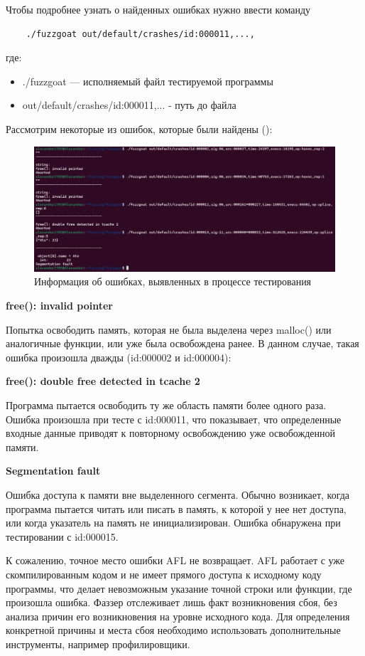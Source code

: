 Чтобы подробнее узнать о найденных ошибках нужно ввести команду
\begin{verbatim}
	./fuzzgoat out/default/crashes/id:000011,...,
\end{verbatim}
где:
\begin{itemize}
	\item ./fuzzgoat — исполняемый файл тестируемой программы
	\item out/default/crashes/id:000011,... - путь до файла
\end{itemize}

Рассмотрим некоторые из ошибок, которые были найдены ():
\begin{figure}[ht] 
	\center
	\includegraphics [scale=1] {my_folder/images/errors_concrete}
	\caption{Информация об ошибках, выявленных в процессе тестирования} 
	\label{fig:errors-concrete-ch4}  
\end{figure}

\textbf{free(): invalid pointer}

Попытка освободить память, которая не была выделена через malloc() или аналогичные функции, или уже была освобождена ранее. В данном случае, такая ошибка произошла дважды (id:000002 и id:000004):

\textbf{free(): double free detected in tcache 2}

Программа пытается освободить ту же область памяти более одного раза. 
Ошибка произошла при тесте с id:000011, что показывает, что определенные входные данные приводят к повторному освобождению уже освобожденной памяти.

\textbf{Segmentation fault}

Ошибка доступа к памяти вне выделенного сегмента. Обычно возникает, когда программа пытается читать или писать в память, к которой у нее нет доступа, или когда указатель на память не инициализирован.
Ошибка обнаружена при тестировании с id:000015.


К сожалению, точное место ошибки AFL не возвращает. AFL работает с уже скомпилированным кодом и не имеет прямого доступа к исходному коду программы, что делает невозможным указание точной строки или функции, где произошла ошибка. Фаззер отслеживает лишь факт возникновения сбоя, без анализа причин его возникновения на уровне исходного кода. Для определения конкретной причины и места сбоя необходимо использовать дополнительные инструменты, например профилировщики.

